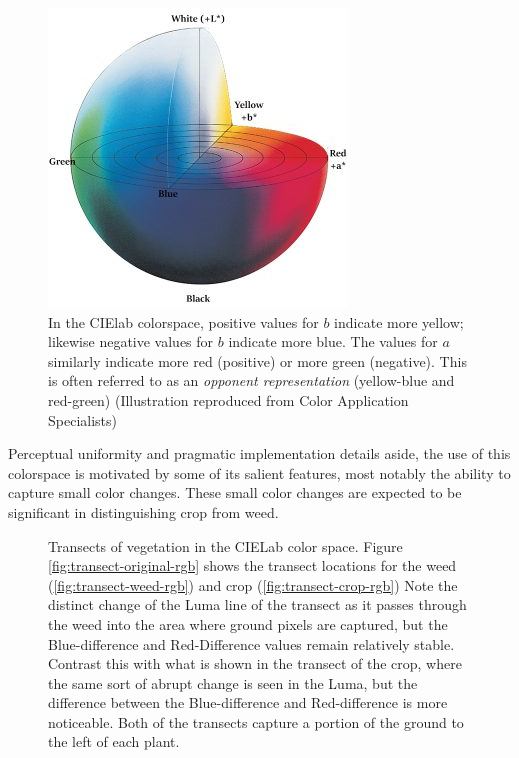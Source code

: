 \documentclass[letterpaper]{article}
\begin{document}
{\begin{figure}[H]
	\centering
	\includegraphics[width=.35\linewidth]{./figures/cielab-colorspace.jpg}
	\caption[CIElab colorspace]{In the CIElab colorspace, positive values for $b$ indicate more yellow; likewise negative values for $b$ indicate more blue. The values for $a$ similarly indicate more red (positive) or more green (negative). This is often referred to as an \textit{opponent representation} (yellow-blue and red-green) (Illustration reproduced from Color Application Specialists)}
	\label{fig:cielab}	
\end{figure}

Perceptual uniformity and pragmatic implementation details aside, the use of this colorspace is motivated by some of its salient features, most notably the ability to capture small color changes. These small color changes are expected to be significant in distinguishing crop from weed.

\begin{figure}[h]
	\centering
	\hfill
	\hfill
	\caption[CIELab Transects]{Transects of vegetation in the CIELab color space. Figure \ref{fig:transect-original-rgb} shows the transect locations for the weed (\ref{fig:transect-weed-rgb}) and crop (\ref{fig:transect-crop-rgb}) Note the distinct change of the Luma line of the transect as it passes through the weed into the area where ground pixels are captured, but the Blue-difference and Red-Difference values remain relatively stable. Contrast this with what is shown in the transect of the crop, where the same sort of abrupt change is seen in the Luma, but the difference between the Blue-difference and Red-difference is more noticeable. Both of the transects capture a portion of the ground to the left of each plant.}
	\label{fig:transects-cielab}
\end{figure}

}
\end{document}
